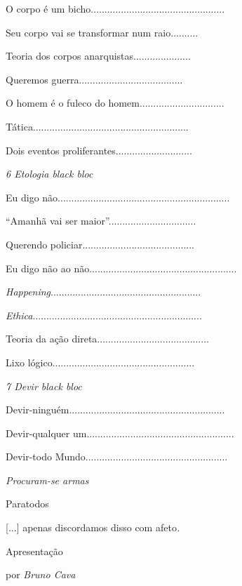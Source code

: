 O corpo é um bicho.................................................

Seu corpo vai se transformar num raio..........

Teoria dos corpos anarquistas.....................

Queremos guerra......................................

O homem é o fuleco do homem...............................

Tática.........................................................

Dois eventos proliferantes............................

\emph{6 Etologia black bloc}

Eu digo
não...............................................................

``Amanhã vai ser maior''................................

Querendo policiar.........................................

Eu digo não ao não......................................................

\emph{Happening}.......................................................

\emph{Ethica}..............................................................

Teoria da ação direta.........................................

Lixo lógico....................................................

\emph{7 Devir black bloc}

Devir-ninguém.........................................................

Devir-qualquer um......................................................

Devir-todo Mundo....................................................

\emph{Procuram-se armas}

Paratodos

{[}...{]} apenas discordamos disso com afeto\emph{.}

Apresentação

por\emph{ Bruno Cava}

